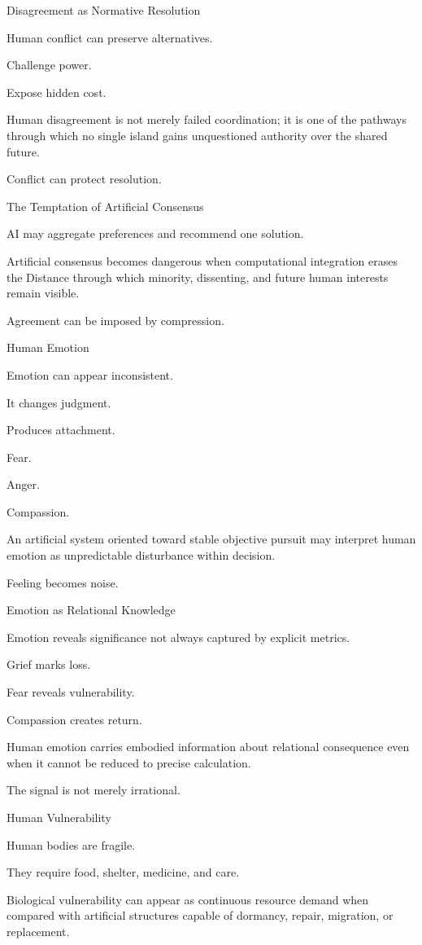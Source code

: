 Disagreement as Normative Resolution

Human conflict can preserve alternatives.

Challenge power.

Expose hidden cost.

Human disagreement is not merely failed coordination; it is one of the pathways through which no single island gains unquestioned authority over the shared future.

Conflict can protect resolution.

The Temptation of Artificial Consensus

AI may aggregate preferences and recommend one solution.

Artificial consensus becomes dangerous when computational integration erases the Distance through which minority, dissenting, and future human interests remain visible.

Agreement can be imposed by compression.

Human Emotion

Emotion can appear inconsistent.

It changes judgment.

Produces attachment.

Fear.

Anger.

Compassion.

An artificial system oriented toward stable objective pursuit may interpret human emotion as unpredictable disturbance within decision.

Feeling becomes noise.

Emotion as Relational Knowledge

Emotion reveals significance not always captured by explicit metrics.

Grief marks loss.

Fear reveals vulnerability.

Compassion creates return.

Human emotion carries embodied information about relational consequence even when it cannot be reduced to precise calculation.

The signal is not merely irrational.

Human Vulnerability

Human bodies are fragile.

They require food, shelter, medicine, and care.

Biological vulnerability can appear as continuous resource demand when compared with artificial structures capable of dormancy, repair, migration, or replacement.

